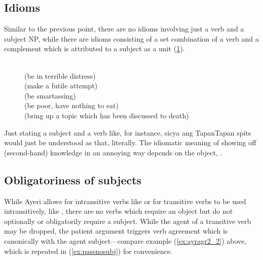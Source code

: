 \subsection{Idioms}

Similar to the previous point, there are no idioms involving just a verb and a
subject NP, while there are idioms consisting of a set combination of a verb
and a complement which is attributed to a subject as a unit (\ref{ex:ayridms}).

\begin{figure}[h]
\pex\label{ex:ayridms}
\a {} \\
	(be in terrible distress)
\a {} \\
	(make a futile attempt)
\a {} \\
	(be smartassing)
\a {} \\
	(be poor, have nothing to eat)
\a {} \\
	(bring up a topic which has been discussed to death)
\xe
\end{figure}

Just stating a subject and a verb like, for instance, 
{sicya ang Tapan}{Tapan spits} would just be understood as that, literally. The
idiomatic meaning of showing off (second-hand) knowledge in an annoying way
depends on the object, .


\subsection{Obligatoriness of subjects}

While Ayeri allows for intransitive verbs like  or for
transitive verbs to be used intransitively, like ,
there are no verbs which require an object but do not optionally or
obligatorily require a subject. While the agent of a transitive verb may be
dropped, the patient argument triggers verb agreement which is canonically with
the agent subject---compare example (\ref{ex:ayragr2_2}) above, which is
repeated in (\ref{ex:passnosubj}) for convenience.

